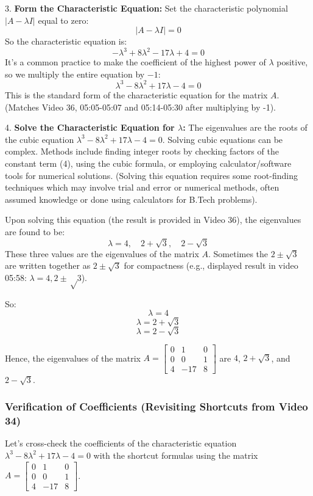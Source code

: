 \documentclass{article}
\begin{document}
3.  \textbf{Form the Characteristic Equation:}
    Set the characteristic polynomial $|A - \lambda I|$ equal to zero:
    \[ |A - \lambda I| = 0 \]
    So the characteristic equation is:
    \[ -\lambda^3 + 8\lambda^2 - 17\lambda + 4 = 0 \]
    It's a common practice to make the coefficient of the highest power of $\lambda$ positive, so we multiply the entire equation by $-1$:
    \[ \lambda^3 - 8\lambda^2 + 17\lambda - 4 = 0 \]
    This is the standard form of the characteristic equation for the matrix $A$. (Matches Video 36, 05:05-05:07 and 05:14-05:30 after multiplying by -1).

4.  \textbf{Solve the Characteristic Equation for $\lambda$:}
    The eigenvalues are the roots of the cubic equation $\lambda^3 - 8\lambda^2 + 17\lambda - 4 = 0$.
    Solving cubic equations can be complex. Methods include finding integer roots by checking factors of the constant term (4), using the cubic formula, or employing calculator/software tools for numerical solutions. (Solving this equation requires some root-finding techniques which may involve trial and error or numerical methods, often assumed knowledge or done using calculators for B.Tech problems).

    Upon solving this equation (the result is provided in Video 36), the eigenvalues are found to be:
    \[ \lambda = 4, \quad 2 + \sqrt{3}, \quad 2 - \sqrt{3} \]
    These three values are the eigenvalues of the matrix $A$. Sometimes the $2 \pm \sqrt{3}$ are written together as $2\pm\sqrt{3}$ for compactness (e.g., displayed result in video 05:58: $\lambda = 4, 2 ± √3$).

    So:
    \[ \lambda = 4 \]
    \[ \lambda = 2 + \sqrt{3} \]
    \[ \lambda = 2 - \sqrt{3} \]

    Hence, the eigenvalues of the matrix $A = \begin{bmatrix} 0 & 1 & 0 \\ 0 & 0 & 1 \\ 4 & -17 & 8 \end{bmatrix}$ are $4$, $2 + \sqrt{3}$, and $2 - \sqrt{3}$.

\subsubsection*{Verification of Coefficients (Revisiting Shortcuts from Video 34)}
Let's cross-check the coefficients of the characteristic equation $\lambda^3 - 8\lambda^2 + 17\lambda - 4 = 0$ with the shortcut formulas using the matrix $A = \begin{bmatrix} 0 & 1 & 0 \\ 0 & 0 & 1 \\ 4 & -17 & 8 \end{bmatrix}$.
\end{document}

